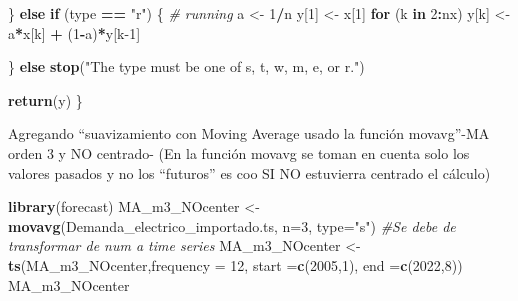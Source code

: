 \documentclass[
]{article}
\newenvironment{Shaded}{\begin{snugshade}}{\end{snugshade}}
\newcommand{\AttributeTok}[1]{\textcolor[rgb]{0.13,0.29,0.53}{#1}}
\newcommand{\CommentTok}[1]{\textcolor[rgb]{0.56,0.35,0.01}{\textit{#1}}}
\newcommand{\ControlFlowTok}[1]{\textcolor[rgb]{0.13,0.29,0.53}{\textbf{#1}}}
\newcommand{\DecValTok}[1]{\textcolor[rgb]{0.00,0.00,0.81}{#1}}
\newcommand{\FunctionTok}[1]{\textcolor[rgb]{0.13,0.29,0.53}{\textbf{#1}}}
\newcommand{\NormalTok}[1]{#1}
\newcommand{\OtherTok}[1]{\textcolor[rgb]{0.56,0.35,0.01}{#1}}
\newcommand{\SpecialCharTok}[1]{\textcolor[rgb]{0.81,0.36,0.00}{\textbf{#1}}}
\newcommand{\StringTok}[1]{\textcolor[rgb]{0.31,0.60,0.02}{#1}}
\begin{document}
\begin{Shaded}
\begin{Highlighting}[]
\NormalTok{    \} }\ControlFlowTok{else} \ControlFlowTok{if}\NormalTok{ (type }\SpecialCharTok{==} \StringTok{"r"}\NormalTok{) \{  }\CommentTok{\# running}
\NormalTok{        a }\OtherTok{\textless{}{-}} \DecValTok{1}\SpecialCharTok{/}\NormalTok{n}
\NormalTok{        y[}\DecValTok{1}\NormalTok{] }\OtherTok{\textless{}{-}}\NormalTok{ x[}\DecValTok{1}\NormalTok{]}
        \ControlFlowTok{for}\NormalTok{ (k }\ControlFlowTok{in} \DecValTok{2}\SpecialCharTok{:}\NormalTok{nx)     y[k] }\OtherTok{\textless{}{-}}\NormalTok{ a}\SpecialCharTok{*}\NormalTok{x[k] }\SpecialCharTok{+}\NormalTok{ (}\DecValTok{1}\SpecialCharTok{{-}}\NormalTok{a)}\SpecialCharTok{*}\NormalTok{y[k}\DecValTok{{-}1}\NormalTok{]}

\NormalTok{    \} }\ControlFlowTok{else}
        \FunctionTok{stop}\NormalTok{(}\StringTok{"The type must be one of \textquotesingle{}s\textquotesingle{}, \textquotesingle{}t\textquotesingle{}, \textquotesingle{}w\textquotesingle{}, \textquotesingle{}m\textquotesingle{}, \textquotesingle{}e\textquotesingle{}, or \textquotesingle{}r\textquotesingle{}."}\NormalTok{)}

    \FunctionTok{return}\NormalTok{(y)}
\NormalTok{\}}
\end{Highlighting}
\end{Shaded}

Agregando ``suavizamiento con Moving Average usado la función
movavg''-MA orden 3 y NO centrado- (En la función movavg se toman en
cuenta solo los valores pasados y no los ``futuros'' es coo SI NO
estuvierra centrado el cálculo)

\begin{Shaded}
\begin{Highlighting}[]
\FunctionTok{library}\NormalTok{(forecast)}
\NormalTok{MA\_m3\_NOcenter }\OtherTok{\textless{}{-}} \FunctionTok{movavg}\NormalTok{(Demanda\_electrico\_importado.ts, }\AttributeTok{n=}\DecValTok{3}\NormalTok{, }\AttributeTok{type=}\StringTok{"s"}\NormalTok{)}
\CommentTok{\#Se debe de transformar de num a time series }
\NormalTok{MA\_m3\_NOcenter }\OtherTok{\textless{}{-}} \FunctionTok{ts}\NormalTok{(MA\_m3\_NOcenter,}\AttributeTok{frequency =} \DecValTok{12}\NormalTok{, }\AttributeTok{start =}\FunctionTok{c}\NormalTok{(}\DecValTok{2005}\NormalTok{,}\DecValTok{1}\NormalTok{), }\AttributeTok{end =}\FunctionTok{c}\NormalTok{(}\DecValTok{2022}\NormalTok{,}\DecValTok{8}\NormalTok{))}
\NormalTok{MA\_m3\_NOcenter}
\end{Highlighting}
\end{Shaded}
\end{document}
